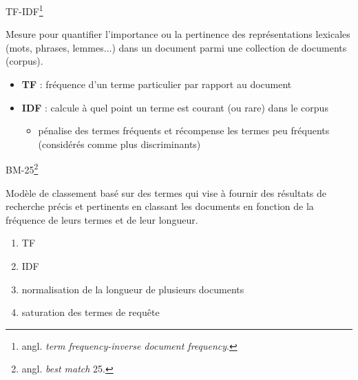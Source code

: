 \begin{frame}{\textsc{TF-IDF}\footnote{angl. \textit{term frequency-inverse document frequency}.}}

\begin{block}{}
\justifying
Mesure pour quantifier l'importance ou la pertinence des représentations lexicales (mots, phrases, lemmes$\dots$) dans un document parmi une collection de documents (corpus).
\end{block}
\begin{itemize}
\item \textbf{TF} : fréquence d'un terme particulier par rapport au document
\item \textbf{IDF} : calcule à quel point un terme est courant (ou rare) dans le corpus
\begin{itemize}
\item pénalise des termes fréquents et récompense les termes peu fréquents (considérés comme plus discriminants)
\end{itemize}
\end{itemize}
\end{frame}

\begin{frame}{\textsc{BM-25}\footnote{angl. \textit{best match} 25.}}

\begin{block}{}
\justifying
Modèle de classement basé sur des termes qui vise à fournir des résultats de recherche précis et pertinents en classant les documents en fonction de la fréquence de leurs termes et de leur longueur.
\end{block}

\begin{enumerate}
\item TF
\item IDF
\item normalisation de la longueur de plusieurs documents
\item saturation des termes de requête
\end{enumerate}
\medskip


\end{frame}


